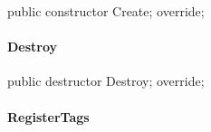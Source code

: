 \documentclass{report}
\newif\ifpdf
\begin{document}
\label{PasDoc_Items.TPasRoutine-Create}
\begin{list}{}{
\setlength{\itemindent}{0cm}
\setlength{\listparindent}{0cm}
\setlength{\leftmargin}{\evensidemargin}
\addtolength{\leftmargin}{\tmplength}
\settowidth{\labelsep}{X}
\addtolength{\leftmargin}{\labelsep}
\setlength{\labelwidth}{\tmplength}
}
\item[\textbf{Declaration}\hfill]
\ifpdf
\begin{flushleft}
\fi
\begin{ttfamily}
public constructor Create; override;\end{ttfamily}

\ifpdf
\end{flushleft}
\fi

\end{list}
\paragraph*{Destroy}\hspace*{\fill}

\label{PasDoc_Items.TPasRoutine-Destroy}
\begin{list}{}{
\setlength{\itemindent}{0cm}
\setlength{\listparindent}{0cm}
\setlength{\leftmargin}{\evensidemargin}
\addtolength{\leftmargin}{\tmplength}
\settowidth{\labelsep}{X}
\addtolength{\leftmargin}{\labelsep}
\setlength{\labelwidth}{\tmplength}
}
\item[\textbf{Declaration}\hfill]
\ifpdf
\begin{flushleft}
\fi
\begin{ttfamily}
public destructor Destroy; override;\end{ttfamily}

\ifpdf
\end{flushleft}
\fi

\end{list}
\paragraph*{RegisterTags}\hspace*{\fill}
\end{document}
